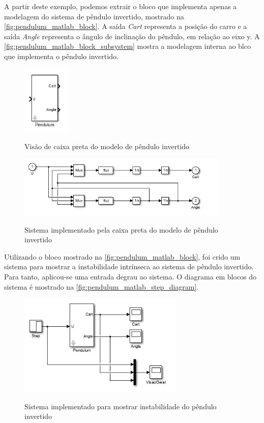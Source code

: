 A partir deste exemplo, podemos extrair o bloco que implementa apenas a modelagem do sistema de pêndulo invertido, mostrado na \autoref{fig:pendulum_matlab_block}. A saída \textit{Cart} representa a posição do carro e a saída \textit{Angle} representa o ângulo de inclinação do pêndulo, em relação ao eixo y. A  \autoref{fig:pendulum_matlab_block_subsystem} mostra a modelagem interna ao blco que implementa o pêndulo invertido.

\begin{figure}[!htb]
    \centering
    \caption{Visão de caixa preta do modelo de pêndulo invertido}
    \includegraphics[width=0.2\textwidth]{./04-figuras/pendulum_matlab_block}
    \label{fig:pendulum_matlab_block}
\end{figure}

\begin{figure}[!htb]
    \centering
    \caption{Sistema implementado pela caixa preta do modelo de pêndulo invertido}
    \includegraphics[width=0.9\textwidth]{./04-figuras/pendulum_matlab_block_subsystem}
    \label{fig:pendulum_matlab_block_subsystem}
\end{figure}

Utilizando o bloco mostrado na \autoref{fig:pendulum_matlab_block}, foi crido um sistema para mostrar a instabilidade intrínseca ao sistema de pêndulo invertido. Para tanto, aplicou-se uma entrada degrau ao sistema. O diagrama em blocos do sistema é mostrado na \autoref{fig:pendulum_matlab_step_diagram}.

\begin{figure}[!htb]
    \centering
    \caption{Sistema implementado para mostrar instabilidade do pêndulo invertido}
    \includegraphics[width=0.7\textwidth]{./04-figuras/pendulum_matlab_step_diagram}
    \label{fig:pendulum_matlab_step_diagram}
\end{figure}


